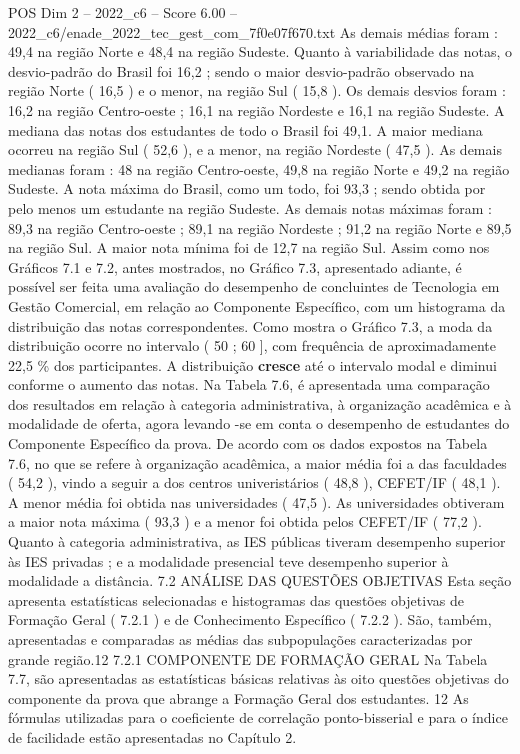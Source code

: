 \begin{textsample}{POS Dim 2 – 2022\_c6 – Score 6.00 – 2022\_c6/enade\_2022\_tec\_gest\_com\_7f0e07f670.txt}
As demais médias foram : 49,4 na região Norte e 48,4 na região Sudeste.
Quanto à variabilidade das notas, o desvio-padrão do Brasil foi 16,2 ; sendo o maior desvio-padrão observado na região Norte ( 16,5 ) e o menor, na região Sul ( 15,8 ).
Os demais desvios foram : 16,2 na região Centro-oeste ; 16,1 na região Nordeste e 16,1 na região Sudeste.
A mediana das notas dos estudantes de todo o Brasil foi 49,1.
A maior mediana ocorreu na região Sul ( 52,6 ), e a menor, na região Nordeste ( 47,5 ).
As demais medianas foram : 48 na região Centro-oeste, 49,8 na região Norte e 49,2 na região Sudeste.
A nota máxima do Brasil, como um todo, foi 93,3 ; sendo obtida por pelo menos um estudante na região Sudeste.
As demais notas máximas foram : 89,3 na região Centro-oeste ; 89,1 na região Nordeste ; 91,2 na região Norte e 89,5 na região Sul.
A maior nota mínima foi de 12,7 na região Sul.
Assim como nos Gráficos 7.1 e 7.2, antes mostrados, no Gráfico 7.3, apresentado adiante, é possível ser feita uma avaliação do desempenho de concluintes de Tecnologia em Gestão Comercial, em relação ao Componente Específico, com um histograma da distribuição das notas correspondentes.
Como mostra o Gráfico 7.3, a moda da distribuição ocorre no intervalo ( 50 ; 60 ], com frequência de aproximadamente 22,5 \% dos participantes.
A distribuição \textbf{cresce} até o intervalo modal e diminui conforme o aumento das notas.
Na Tabela 7.6, é apresentada uma comparação dos resultados em relação à categoria administrativa, à organização acadêmica e à modalidade de oferta, agora levando -se em conta o desempenho de estudantes do Componente Específico da prova.
De acordo com os dados expostos na Tabela 7.6, no que se refere à organização acadêmica, a maior média foi a das faculdades ( 54,2 ), vindo a seguir a dos centros univeristários ( 48,8 ), CEFET/IF ( 48,1 ).
A menor média foi obtida nas universidades ( 47,5 ).
As universidades obtiveram a maior nota máxima ( 93,3 ) e a menor foi obtida pelos CEFET/IF ( 77,2 ).
Quanto à categoria administrativa, as IES públicas tiveram desempenho superior às IES privadas ; e a modalidade presencial teve desempenho superior à modalidade a distância. 7.2 ANÁLISE DAS QUESTÕES OBJETIVAS Esta seção apresenta estatísticas selecionadas e histogramas das questões objetivas de Formação Geral ( 7.2.1 ) e de Conhecimento Específico ( 7.2.2 ).
São, também, apresentadas e comparadas as médias das subpopulações caracterizadas por grande região.12 7.2.1 COMPONENTE DE FORMAÇÃO GERAL Na Tabela 7.7, são apresentadas as estatísticas básicas relativas às oito questões objetivas do componente da prova que abrange a Formação Geral dos estudantes. 12 As fórmulas utilizadas para o coeficiente de correlação ponto-bisserial e para o índice de facilidade estão apresentadas no Capítulo 2.

\end{textsample}
